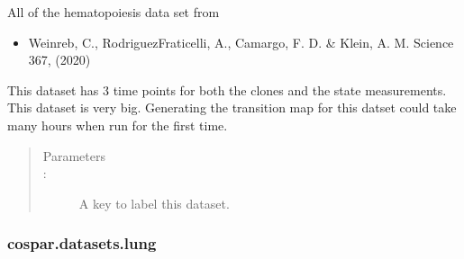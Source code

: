 \documentclass[letterpaper,10pt,english]{sphinxmanual}
\begin{document}
\begin{fulllineitems}
\label{\detokenize{cospar.datasets.hematopoiesis_all:cospar.datasets.hematopoiesis_all}}
All of the hematopoiesis data set from
\begin{itemize}
\item {} 
Weinreb, C., Rodriguez\sphinxhyphen{}Fraticelli, A., Camargo, F. D. \& Klein, A. M. Science 367, (2020)

\end{itemize}

This dataset has 3 time points for both the clones and the state measurements.
This dataset is very big. Generating the transition map for this datset
could take many hours when run for the first time.
\begin{quote}\begin{description}
\item[{Parameters}] \leavevmode\item[{ : }] \leavevmode
A key to label this dataset.


\end{description}\end{quote}

\end{fulllineitems}



\subsubsection{cospar.datasets.lung}
\label{\detokenize{cospar.datasets.lung:cospar-datasets-lung}}\label{\detokenize{cospar.datasets.lung::doc}}
\end{document}
